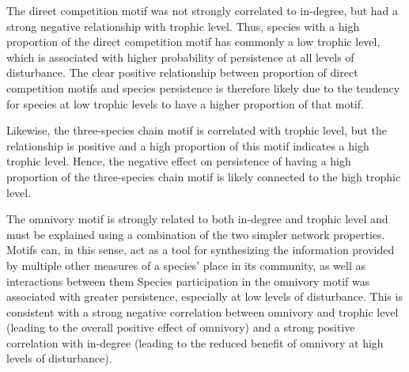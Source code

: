 \documentclass[12pt]{article}
\begin{document}
\begin{spacing}{2.0}
The direct competition motif was not strongly correlated to in-degree, but had a strong negative relationship with trophic level. Thus, species with a high proportion of the direct competition motif has commonly a low trophic level, which is associated with higher probability of persistence at all levels of disturbance.
The clear positive relationship between proportion of direct competition motifs and species persistence is therefore likely due to the tendency for species at low trophic levels to have a higher proportion of that motif.


Likewise, the three-species chain motif is correlated with trophic level, but the relationship is positive and a high proportion of this motif indicates a high trophic level. Hence, the negative effect on persistence of having a high proportion of the three-species chain motif is likely connected to the high trophic level. 

The omnivory motif is strongly related to both in-degree and trophic level and must be explained using a combination of the two simpler network properties.
Motifs can, in this sense, act as a tool for synthesizing the information provided by multiple other measures of a species' place in its community, as well as interactions between them
Species participation in the omnivory motif was associated with greater persistence, especially at low levels of disturbance.
This is consistent with a strong negative correlation between omnivory and trophic level (leading to the overall positive effect of omnivory) and a strong positive correlation with in-degree (leading to the reduced benefit of omnivory at high levels of disturbance). 



\end{spacing}
\end{document}
